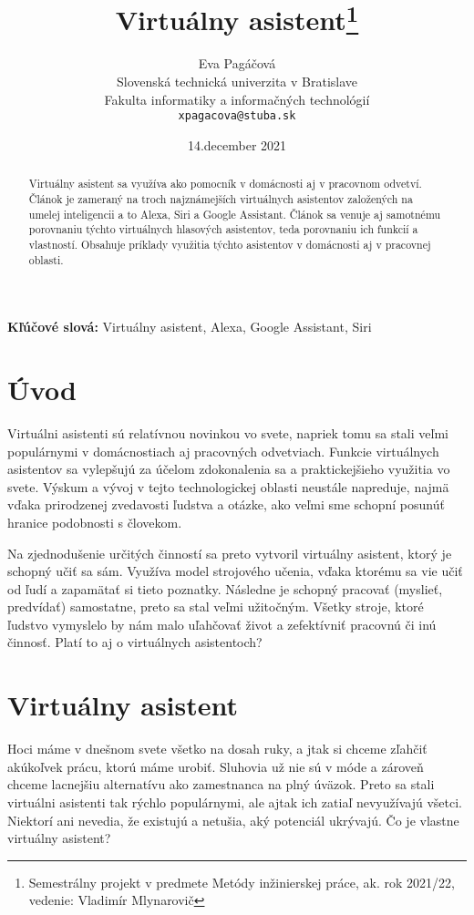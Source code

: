 \documentclass[10pt,twoside,slovak,coursepaper]{article}
\title{Virtuálny asistent\thanks{Semestrálny projekt v predmete Metódy inžinierskej práce, ak. rok 2021/22, vedenie: Vladimír Mlynarovič}}
\author{Eva Pagáčová\\[2pt]
	{\small Slovenská technická univerzita v Bratislave}\\
	{\small Fakulta informatiky a informačných technológií}\\
	{\small \texttt{xpagacova@stuba.sk}}
	}
\date{\small 14.december 2021}
\begin{document}
\maketitle

\begin{abstract}
Virtuálny asistent sa využíva ako pomocník v domácnosti aj v pracovnom odvetví. Článok je zameraný na troch najznámejších virtuálnych asistentov založených na umelej inteligencii a to Alexa, Siri a Google Assistant. Článok sa venuje aj samotnému porovnaniu týchto virtuálnych hlasových asistentov, teda porovnaniu ich funkcií a vlastností. Obsahuje príklady využitia týchto asistentov v domácnosti aj v pracovnej oblasti.
\end{abstract}

{\bf Kľúčové slová:} Virtuálny asistent, Alexa, Google Assistant, Siri

\section{Úvod}

Virtuálni asistenti sú relatívnou novinkou vo svete, napriek tomu sa stali veľmi populárnymi v domácnostiach aj pracovných odvetviach. Funkcie virtuálnych asistentov sa vylepšujú za účelom zdokonalenia sa a praktickejšieho využitia vo svete. Výskum a vývoj v tejto technologickej oblasti neustále napreduje, najmä vďaka prirodzenej zvedavosti ľudstva a otázke, ako veľmi sme schopní posunúť hranice podobnosti s človekom. 

Na zjednodušenie určitých činností sa preto vytvoril virtuálny asistent, ktorý je schopný učiť sa sám. Využíva model strojového učenia, vďaka ktorému sa vie učiť od ľudí a zapamätať si tieto poznatky. Následne je schopný pracovať (myslieť, predvídať) samostatne, preto sa stal veľmi užitočným. Všetky stroje, ktoré ľudstvo vymyslelo by nám malo uľahčovať život a zefektívniť pracovnú či inú činnosť. Platí to aj o virtuálnych asistentoch? 

\section{Virtuálny asistent}
Hoci máme v dnešnom svete všetko na dosah ruky, a jtak si chceme zľahčiť akúkoľvek prácu, ktorú máme urobiť. Sluhovia už nie sú v móde a zároveň chceme lacnejšiu alternatívu ako zamestnanca na plný úväzok. Preto sa stali virtuálni asistenti tak rýchlo populárnymi, ale ajtak ich zatiaľ nevyužívajú všetci. Niektorí ani nevedia, že existujú a netušia, aký potenciál ukrývajú. Čo je vlastne virtuálny asistent?
\end{document}
